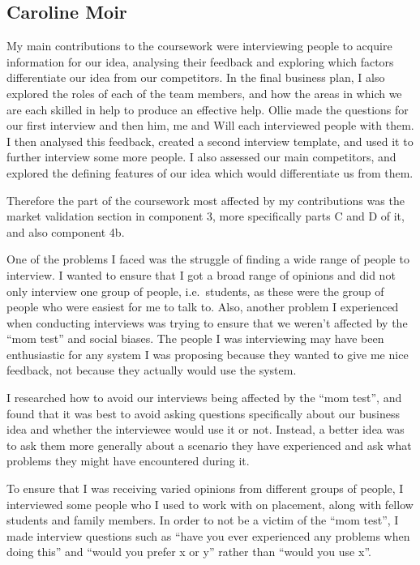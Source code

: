 \documentclass[10pt,a4paper]{article}
\begin{document}
\begin{appendices}
\subsection{Caroline Moir}\label{subsec:carolineMoir}
My main contributions to the coursework were interviewing people to acquire information for our idea, analysing their feedback and exploring which factors differentiate our idea from our competitors. In the final business plan, I also explored the roles of each of the team members, and how the areas in which we are each skilled in help to produce an effective help. Ollie made the questions for our first interview and then him, me and Will each interviewed people with them. I then analysed this feedback, created a second interview template, and used it to further interview some more people. I also assessed our main competitors, and explored the defining features of our idea which would differentiate us from them.

Therefore the part of the coursework most affected by my contributions was the market validation section in component 3, more specifically parts C and D of it, and also component 4b.

One of the problems I faced was the struggle of finding a wide range of people to interview. I wanted to ensure that I got a broad range of opinions and did not only interview one group of people, i.e.\ students, as these were the group of people who were easiest for me to talk to. Also, another problem I experienced when conducting interviews was trying to ensure that we weren't affected by the ``mom test'' and social biases. The people I was interviewing may have been enthusiastic for any system I was proposing because they wanted to give me nice feedback, not because they actually would use the system.

I researched how to avoid our interviews being affected by the ``mom test'', and found that it was best to avoid asking questions specifically about our business idea and whether the interviewee would use it or not. Instead, a better idea was to ask them more generally about a scenario they have experienced and ask what problems they might have encountered during it.

To ensure that I was receiving varied opinions from different groups of people, I interviewed some people who I used to work with on placement, along with fellow students and family members. In order to not be a victim of the ``mom test'', I made interview questions such as ``have you ever experienced any problems when doing this'' and ``would you prefer x or y'' rather than ``would you use x''.


\end{appendices}
\end{document}
